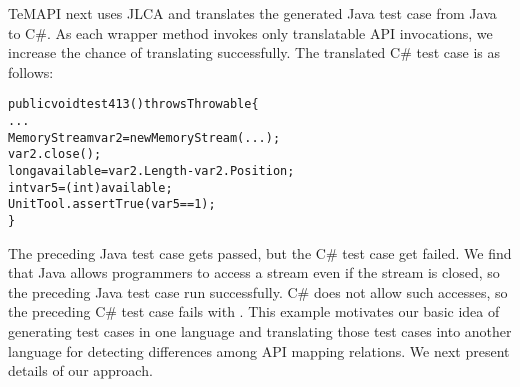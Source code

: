 TeMAPI next uses JLCA and translates the generated Java test case from Java to C\#. As each wrapper method invokes only translatable API invocations, we increase the chance of translating successfully. The translated C\# test case is as follows:

\begin{CodeOut}\vspace*{-1ex}
\begin{alltt}
public void test413() throws Throwable\{
  ...
  MemoryStream var2 = new MemoryStream(...);
  var2.close();
  long available = var2.Length - var2.Position;
  int var5 = (int) available;
  UnitTool.assertTrue(var5 == 1);
\}
\end{alltt}
\end{CodeOut}\vspace*{-2ex}

The preceding Java test case gets passed, but the C\# test case get failed. We find that Java allows programmers to access a stream even if the stream is closed, so the preceding Java test case run successfully. C\# does not allow such accesses, so the preceding C\# test case fails with . This example motivates our basic idea of generating test cases in one language and translating those test cases into another language for detecting differences among API mapping relations. We next present details of our approach.


